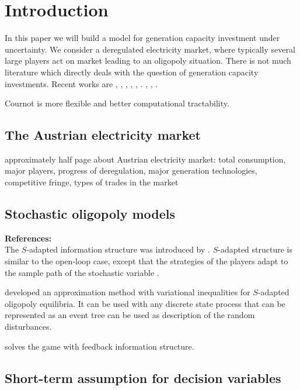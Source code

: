 \section{Introduction}

In this paper we will build a model for generation capacity investment under uncertainty. We consider a deregulated electricity market, where typically several large players act on market leading to an oligopoly situation. There is not much literature which directly deals with the question of  generation capacity investments. Recent works are \cite{Chuang2001}, \cite{Ventosa2002}, \cite{Chaton2003}, \cite{Hogendorn2003}, \cite{Pineau2003}, \cite{Ehrenmann2004}. \cite{Murphy2005}, \cite{Kiesling2007}, \cite{Pineau2007}.


Cournot is more flexible and better computational tractability.

\subsection{The Austrian electricity market}

approximately half page about Austrian electricity market: total consumption, major players, progress of deregulation, major generation technologies, competitive fringe, types of trades in the market


\subsection{Stochastic oligopoly models}

\textbf{References:} \cite{Salant1982, Wolf1997, Haurie2002, Pineau2003, Murto2004}\\


The $S$-adapted information structure was introduced by \cite{Haurie1990}.
$S$-adapted structure is similar to the open-loop case, except that the strategies of the players adapt to the sample path of the stochastic variable \citep[see][pg. 128]{Pineau2003}.

\cite{Haurie2002} developed an approximation method with variational inequalities for $S$-adapted oligopoly equilibria. It can be used with any discrete state process that can be represented as an event tree can be used as description of the random disturbances.

\cite{Murto2004} solves the game with feedback information structure.

\subsection{Short-term assumption for decision variables}

